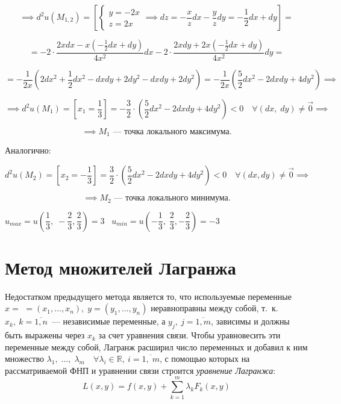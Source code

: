 \documentclass[../../main.tex]{subfiles}
\begin{document}
\begin{example}
	\[\implies d^2u\left(M_{1, 2}\right) = \left[
	\begin{cases}
	y = -2x\\
	z = 2x 
	\end{cases} \implies dz = -\dfrac{x}{z}dx - \dfrac{y}{z}dy = 
	-\dfrac{1}{2}dx + dy 
	\right] =\]
	
	\[= -2 \cdot \frac{2xdx - x\left(-\frac{1}{2}dx + dy\right)}{4x^2}dx - 
	2 \cdot \frac{2xdy + 2x \left(-\frac{1}{2}dx + dy\right)}{4x^2}dy =\]
	
	\[= -\dfrac{1}{2x}\left(2dx^2 + \dfrac{1}{2}dx^2 - dxdy + 2dy^2 - 
	dxdy + 2dy^2 \right) = -\dfrac{1}{2x} \left( \dfrac{5}
	{2} dx^2 - 2dxdy + 4dy^2 \right) \implies\]
	
	\[\implies d^2u\left(M_1\right) = \left[x_1 = \dfrac{1}{3}\right] = 
	-\dfrac{3}{2}\cdot\left(\dfrac{5}{2}dx^2 - 2dxdy + 
	4dy^2\right) < 0 \quad 
	\forall \left(dx, \; dy\right) \neq \vec{0} \implies\]
	
	\[\implies M_1 \text{~--- точка локального максимума}.\]
	
	Аналогично:
	
	\[d^2u \left(M_2\right) = \left[x_2 = -\dfrac{1}{3} \right] = 
	\dfrac{3}{2} \cdot \left( \dfrac{5}{2} dx^2 - 2dxdy + 4dy^2\right) < 0 
	\quad \forall \left(dx, dy\right) \neq \vec{0} \implies\]
	
	\[ \implies M_2 
	\text{~--- точка локального минимума}.\]
	
	$u_{max} = u\left(\dfrac{1}{3}, \; -\dfrac{2}{3}, 
	\dfrac{2}{3}\right) = 3 \;\;\; 
	u_{min} = u\left(-\dfrac{1}{3}, \; 
	\dfrac{2}{3}, -\dfrac{2}{3}\right) = -3$ 
\end{example}

	\section{Метод множителей Лагранжа} 
	
	Недостатком предыдущего метода является то, что используемые переменные 
	$x = $ $=\left(x_1, \ldots, x_n\right), \; y = \left(y_1,\ldots, y_n\right)$
	неравноправны между собой, т.~к. $x_k,\ k = \overline{1, n}$~--- 
	независимые переменные, а $y_j,\ j = \overline{1, m}$, зависимы и 
	должны быть выражены через $x_k$ за счет уравнения связи. 
	Чтобы уравновесить эти переменные между собой, Лагранж расширил 
	число переменных и добавил к ним множество 
	$\lambda_1,\; \ldots,\; \lambda_m\quad \forall 
	\lambda_i \in \mathbb{R},\ i = \overline{1,\; m}$, 
	с помощью которых на рассматриваемой ФНП и уравнении 
	связи строится \emph{уравнение Лагранжа}:
	\begin{equation}
	L\left(x, y\right) = f\left(x, y\right) + \sum\limits_{k = 1}^m 
	\lambda_k F_k\left(x, y\right) \label{lec11.1:8}
	\end{equation}
	
\end{document}
